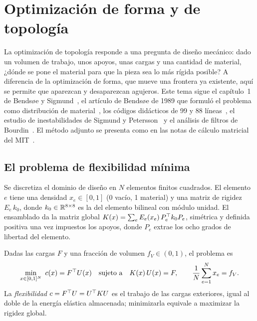 \chapter{Optimización de forma y de topología}
\label{tema:2}

La optimización de topología responde a una pregunta de diseño mecánico: dado un volumen de trabajo, unos apoyos, unas cargas y una cantidad de material, ¿dónde se pone el material para que la pieza sea lo más rígida posible? A diferencia de la optimización de forma, que mueve una frontera ya existente, aquí se permite que aparezcan y desaparezcan agujeros. Este tema sigue el capítulo~1 de Bendsøe y Sigmund~\cite{bs}, el artículo de Bendsøe de 1989 que formuló el problema como distribución de material~\cite{bendsoe89}, los códigos didácticos de 99 y 88 líneas~\cite{sigmund99,andreassen}, el estudio de inestabilidades de Sigmund y Petersson~\cite{sigpet} y el análisis de filtros de Bourdin~\cite{bourdin}. El método adjunto se presenta como en las notas de cálculo matricial del MIT~\cite[§6.3]{mit18s096}.

\section{El problema de flexibilidad mínima}

Se discretiza el dominio de diseño en $N$ elementos finitos cuadrados. El elemento $e$ tiene una densidad $x_e\in[0,1]$ (0 vacío, 1 material) y una matriz de rigidez $E_e\,k_0$, donde $k_0\in\mathbb{R}^{8\times 8}$ es la del elemento bilineal con módulo unidad. El ensamblado da la matriz global $K(x)=\sum_e E_e(x_e)\,P_e^\top k_0P_e$, simétrica y definida positiva una vez impuestos los apoyos, donde $P_e$ extrae los ocho grados de libertad del elemento.

\begin{definicion}\label{def:compliance}
Dadas las cargas $F$ y una fracción de volumen $f_V\in(0,1)$, el problema es
\[
\min_{x\in[0,1]^N}\ c(x)=F^\T U(x)\quad\text{sujeto a}\quad K(x)\,U(x)=F,\qquad \frac1N\sum_{e=1}^N x_e=f_V .
\]
La \emph{flexibilidad} $c=F^\top U=U^\top KU$ es el trabajo de las cargas exteriores, igual al doble de la energía elástica almacenada; minimizarla equivale a maximizar la rigidez global.
\end{definicion}

